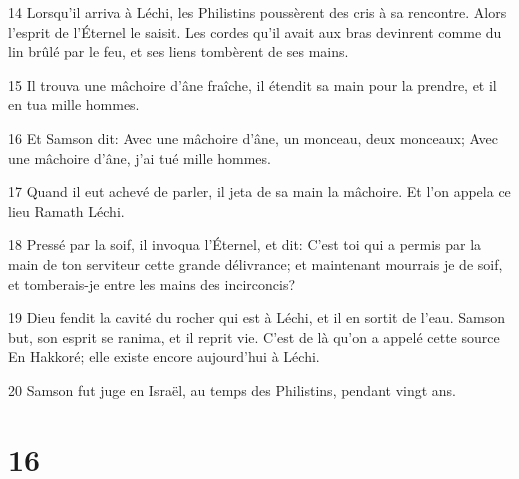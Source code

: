 \par 14 Lorsqu'il arriva à Léchi, les Philistins poussèrent des cris à sa rencontre. Alors l'esprit de l'Éternel le saisit. Les cordes qu'il avait aux bras devinrent comme du lin brûlé par le feu, et ses liens tombèrent de ses mains.
\par 15 Il trouva une mâchoire d'âne fraîche, il étendit sa main pour la prendre, et il en tua mille hommes.
\par 16 Et Samson dit: Avec une mâchoire d'âne, un monceau, deux monceaux; Avec une mâchoire d'âne, j'ai tué mille hommes.
\par 17 Quand il eut achevé de parler, il jeta de sa main la mâchoire. Et l'on appela ce lieu Ramath Léchi.
\par 18 Pressé par la soif, il invoqua l'Éternel, et dit: C'est toi qui a permis par la main de ton serviteur cette grande délivrance; et maintenant mourrais je de soif, et tomberais-je entre les mains des incirconcis?
\par 19 Dieu fendit la cavité du rocher qui est à Léchi, et il en sortit de l'eau. Samson but, son esprit se ranima, et il reprit vie. C'est de là qu'on a appelé cette source En Hakkoré; elle existe encore aujourd'hui à Léchi.
\par 20 Samson fut juge en Israël, au temps des Philistins, pendant vingt ans.

\chapter{16}

